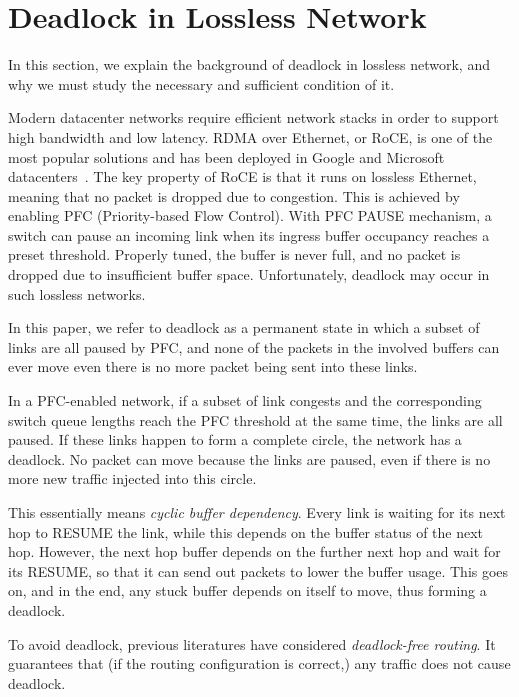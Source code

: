\secspace
\section{Deadlock in Lossless Network}
\secspace

In this section, we explain the background of deadlock in lossless network, and 
why we must study the necessary and sufficient condition of it.

Modern datacenter networks require efficient network stacks in order to support 
high bandwidth and low latency. RDMA over Ethernet, or RoCE, is one of the most popular
solutions and has been deployed in Google and Microsoft datacenters~\cite{dcqcn, timely}.
The key property of RoCE is that it runs on lossless Ethernet, meaning
that no packet is dropped due to congestion. This is achieved by enabling PFC 
(Priority-based Flow Control). With PFC PAUSE mechanism, a switch can pause an incoming link
when its ingress buffer occupancy reaches a preset threshold. Properly tuned, the 
buffer is never full, and no packet is dropped due to insufficient buffer space.
Unfortunately, deadlock may occur in such lossless networks.


In this paper, we refer to deadlock as a permanent state in which a subset of links are all paused
by PFC, and none of the packets in the involved buffers can ever move even there is 
no more packet being sent into these links.

In a PFC-enabled network, if a subset of link congests and the corresponding switch queue lengths reach
the PFC threshold at the same time, the links are all paused. If these links happen
to form a complete circle, the network has a deadlock. No packet can move because 
the links are paused, even if there is no more new traffic injected into this circle.

This essentially means {\em cyclic buffer dependency}. Every link is waiting for its next
hop to RESUME the link, while this depends on the buffer status of the next hop. However,
the next hop buffer depends on the further next hop and wait for its RESUME,
so that it can send out packets to lower the buffer usage. This goes on, and in the end, 
any stuck buffer depends on itself to move, thus forming a deadlock.

To avoid deadlock, previous literatures have considered {\em deadlock-free routing}. It 
guarantees that (if the routing configuration is correct,) any traffic does not
cause deadlock.

